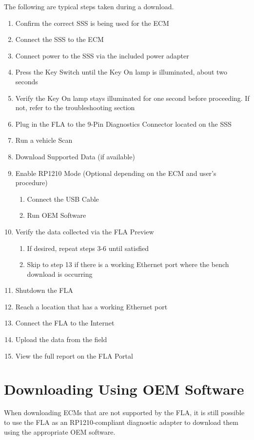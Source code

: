 \documentclass[11pt, oneside]{book}
\begin{document}
The following are typical steps taken during a download.
\begin{enumerate}
\item Confirm the correct SSS is being used for the ECM
\item Connect the SSS to the ECM
\item Connect power to the SSS via the included power adapter
\item Press the Key Switch until the Key On lamp is illuminated, about two
seconds
\item Verify the Key On lamp stays illuminated for one second before proceeding.
If not, refer to the troubleshooting section
\item Plug in the FLA to the 9-Pin Diagnostics Connector located on the
SSS
\item Run a vehicle Scan
\item Download Supported Data (if available)
\item Enable RP1210 Mode (Optional depending on the ECM and user's procedure)

\begin{enumerate}
\item Connect the USB Cable
\item Run OEM Software
\end{enumerate}
\item Verify the data collected via the FLA Preview

\begin{enumerate}
\item If desired, repeat steps 3-6 until satisfied
\item Skip to step 13 if there is a working Ethernet port where the bench
download is occurring
\end{enumerate}
\item Shutdown the FLA
\item Reach a location that has a working Ethernet port
\item Connect the FLA to the Internet
\item Upload the data from the field
\item View the full report on the FLA Portal
\end{enumerate}

\section{Downloading Using OEM Software}\label{sec:oem_software}

When downloading ECMs that are not supported by the FLA, it is still possible to use the
FLA as an RP1210-compliant diagnostic adapter to download them using the appropriate OEM
software.
\end{document}
